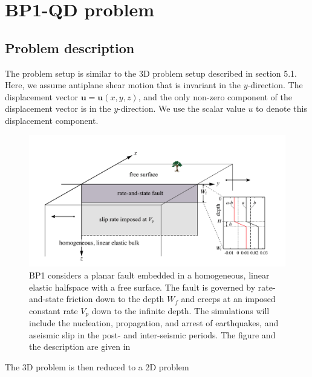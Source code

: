 \section{BP1-QD problem}
\subsection{Problem description}
The problem setup is similar to the 3D problem setup described in section 5.1. Here, we assume antiplane shear motion that is invariant in the $y$-direction.
The displacement vector $\textbf{u} = \textbf{u}(x,y,z)$, and the only non-zero component of the displacement vector is in the $y$-direction.
We use the scalar value $u$ to denote this displacement component.

\begin{figure}
    \centering
    \includegraphics[width=\linewidth]{figures/BP1-figure}
    \caption{BP1 considers a planar fault embedded in a homogeneous, linear elastic halfspace with a free surface. The fault is governed by rate-and-state friction down to the depth $W_f$ and creeps at an imposed constant rate $V_p$ down to the infinite depth. The simulations will include the nucleation, propagation, and arrest of earthquakes, and aseismic slip in the post- and inter-seismic periods. The figure and the description are given in \cite{erickson2018seas}}
    \label{fig:enter-label}
\end{figure}



The 3D problem is then reduced to a 2D problem

